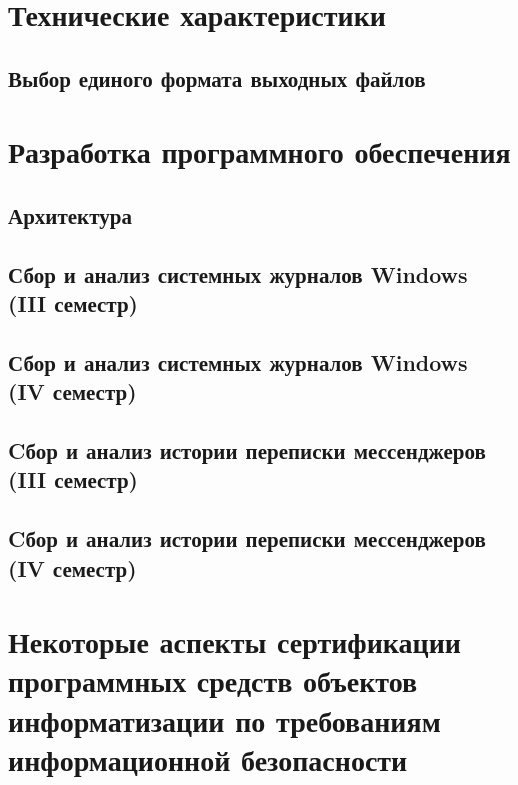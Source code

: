 \section{Технические характеристики}

\subsection{Выбор единого формата выходных файлов}


\section{Разработка программного обеспечения}
\setcounter{figure}{0}

\subsection{Архитектура}

\subsection{Сбор и анализ системных журналов Windows (III семестр)} %

\subsection{Сбор и анализ системных журналов Windows (IV семестр)} 

\newpage
\subsection{Cбор и анализ истории переписки мессенджеров (III семестр)} %

\subsection{Cбор и анализ истории переписки мессенджеров (IV семестр)} 


\section{Некоторые аспекты сертификации программных средств объектов\\ информатизации по требованиям информационной безопасности} %
\setcounter{figure}{0}


